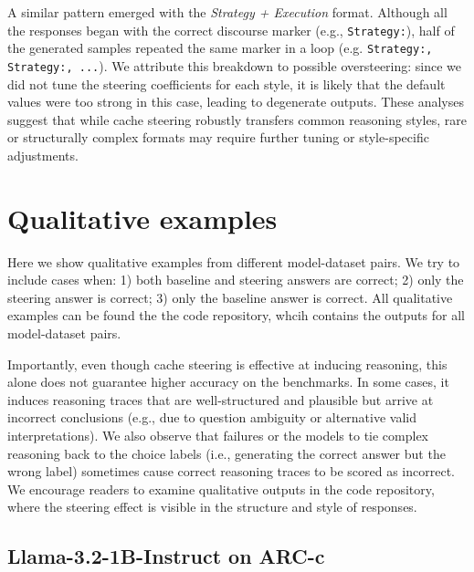 \documentclass{article} %
\begin{document}
A similar pattern emerged with the \textit{Strategy + Execution} format. Although all the responses began with the correct discourse marker (e.g., \texttt{Strategy:}), half of the generated samples repeated the same marker in a loop (e.g. \texttt{Strategy:, Strategy:, ...}). We attribute this breakdown to possible oversteering: since we did not tune the steering coefficients for each style, it is likely that the default values were too strong in this case, leading to degenerate outputs.
These analyses suggest that while cache steering robustly transfers common reasoning styles, rare or structurally complex formats may require further tuning or style-specific adjustments.

\section{Qualitative examples} \label{qualitative_examples}

Here we show qualitative examples from different model-dataset pairs. We try to include cases when: 1) both baseline and steering answers are correct; 2) only the steering answer is correct; 3) only the baseline answer is correct. All qualitative examples can be found the the code repository, whcih contains the outputs for all model-dataset pairs.

Importantly, even though cache steering is effective at inducing reasoning, this alone does not guarantee higher accuracy on the benchmarks. In some cases, it induces reasoning traces that are well-structured and plausible but arrive at incorrect conclusions (e.g., due to question ambiguity or alternative valid interpretations). We also observe that failures or the models to tie complex reasoning back to the choice labels (i.e., generating the correct answer but the wrong label) sometimes cause correct reasoning traces to be scored as incorrect. We encourage readers to examine qualitative outputs in the code repository, where the steering effect is visible in the structure and style of responses.

\subsection{Llama-3.2-1B-Instruct on ARC-c}
\end{document}
